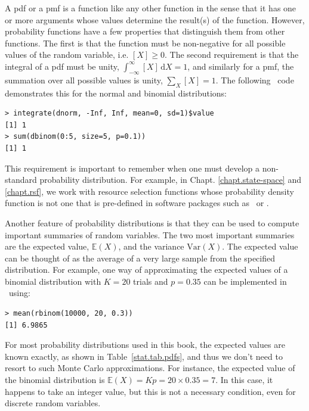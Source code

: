A pdf or a pmf is a function like any other function
in the sense that it has one or more arguments whose values determine
the result(s) of the function. However, probability functions have a few
properties that distinguish them from other functions.
The first is that the function
must be non-negative for all possible values of the random variable,
i.e. $[X] \geq 0$. The second requirement is that the integral of
a pdf must be unity, $\int_{-\infty}^{\infty} [X]\, \text{d}{X} = 1$, and similarly
for a pmf, the summation over all possible values is unity, $\sum_X [X]
= 1$. The following \R~code demonstrates
this for the normal and binomial distributions:
\begin{verbatim}
> integrate(dnorm, -Inf, Inf, mean=0, sd=1)$value
[1] 1
> sum(dbinom(0:5, size=5, p=0.1))
[1] 1
\end{verbatim}
This requirement is important to remember when one must develop a
non-standard probability distribution. For example, in Chapt.
\ref{chapt.state-space} and \ref{chapt.rsf},
we work with resource selection functions whose probability
density function is not one that is pre-defined in software packages
such as \R~or \bugs.

Another feature of probability distributions is that they can be used
to compute important summaries of random variables. The two most
important summaries are the expected value, $\mathbb{E}(X)$,
and the variance $\text{Var}(X)$. The expected value
can be thought of as the average
of a very large sample from the specified distribution. For
example, %
one way of approximating the expected values of a binomial
distribution with $K=20$ trials and $p=0.35$ can be implemented in \R~using:
\begin{verbatim}
> mean(rbinom(10000, 20, 0.3))
[1] 6.9865
\end{verbatim}
For most probability distributions used in this book, the expected
values are known exactly, as shown in Table~\ref{stat.tab.pdfs}, and
thus we don't need to resort to such Monte Carlo approximations. For instance, the
expected value of the binomial distribution is $\mathbb{E}(X) = Kp =
20 \times 0.35 = 7$. In this case, it happens to take an integer
value, but this is not a necessary condition, even for discrete random
variables.

